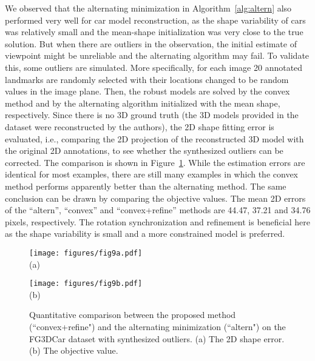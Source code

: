 \documentclass[10pt,journal,cspaper,compsoc]{IEEEtran}
\newcommand{\refFig}[1]{Figure~\ref{#1}}
\newcommand{\refAlg}[1]{Algorithm~\ref{#1}}
\begin{document}
We observed that the alternating minimization in \refAlg{alg:altern} also performed very well for car model reconstruction, as the shape variability of cars was relatively small and the mean-shape initialization was very close to the true solution. But when there are outliers in the observation, the initial estimate of viewpoint might be unreliable and the alternating algorithm may fail. To validate this, some outliers are simulated. More specifically, for each image 20 annotated landmarks are randomly selected with their locations changed to be random values in the image plane. Then, the robust models are solved by the convex method and by the alternating algorithm initialized with the mean shape, respectively. Since there is no 3D ground truth (the 3D models provided in the dataset were reconstructed by the authors), the 2D shape fitting error is evaluated, i.e., comparing the 2D projection of the reconstructed 3D model with the original 2D annotations, to see whether the synthesized outliers can be corrected. The comparison is shown in \refFig{fig:fg3dcar-quant}. While the estimation errors are identical for most examples, there are still many examples in which the convex method performs apparently better than the alternating method. The same conclusion can be drawn by comparing the objective values. {The mean 2D errors of the ``altern'', ``convex'' and ``convex+refine'' methods are 44.47, 37.21 and 34.76 pixels, respectively. The rotation synchronization and refinement is beneficial here as the shape variability is small and a more constrained model is preferred.}

\begin{figure}
\begin{minipage}[b]{0.48\linewidth}
  \centering
  \texttt{[image: figures/fig9a.pdf]} \\ (a)
\end{minipage}
\begin{minipage}[b]{0.48\linewidth}
  \centering
  \texttt{[image: figures/fig9b.pdf]} \\ (b)
\end{minipage}
  \caption{Quantitative comparison between the proposed method (``convex+refine") and the alternating minimization (``altern") on the FG3DCar dataset with synthesized outliers. (a) The 2D shape error. (b) The objective value. }\label{fig:fg3dcar-quant}
\end{figure}
\end{document}
